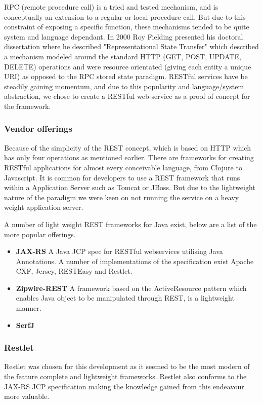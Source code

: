 \documentclass[pdftex,11pt,a4paper]{article}
\begin{document}
RPC (remote procedure call) is a tried and tested mechanism, and is conceptually an extension to a regular or local procedure call. But due to this constraint of exposing a specific function, these mechanisms tended to be quite system and language dependant. In 2000 Roy Fielding presented his doctoral dissertation where he described "Representational State Transfer"\cite{REST} which described a mechanism modeled around the standard HTTP (GET, POST, UPDATE, DELETE) operations and were resource orientated (giving each entity a unique URI) as opposed to the RPC stored state paradigm. RESTful services have be steadily gaining momentum, and due to this popularity and language/system abstraction, we chose to create a RESTful web-service as a proof of concept for the framework.

\subsubsection{Vendor offerings}
Because of the simplicity of the REST concept, which is based on HTTP which has only four operations as mentioned earlier. There are frameworks for creating RESTful applications for almost every conceivable language, from Clojure\cite{website:compojure-rest} to Javascript\cite{website:persevere}. It is common for developers to use a REST framework that runs within a Application Server such as Tomcat\cite{website:tomcat} or JBoss\cite{website:jboss}. But due to the lightweight nature of the paradigm we were keen on not running the service on a heavy weight application server.

A number of light weight REST frameworks for Java exist, below are a list of the more popular offerings.

\begin{itemize}
	\item \textbf{JAX-RS} A Java JCP spec for RESTful webservices utilising Java Annotations. A number of implementations of the specification exist Apache CXF, Jersey, RESTEasy and Restlet.
	\item \textbf{Zipwire-REST} A framework based on the ActiveResource pattern which enables Java object to be manipulated through REST, is a lightweight manner.
	\item \textbf{SerfJ}
\end{itemize}

\subsubsection{Restlet}
Restlet was chosen for this development as it seemed to be the most modern of the feature complete and lightweight frameworks. Restlet also conforms to the JAX-RS JCP specification\cite{website:jax-rs_jcp} making the knowledge gained from this endeavour more valuable.
\end{document}
